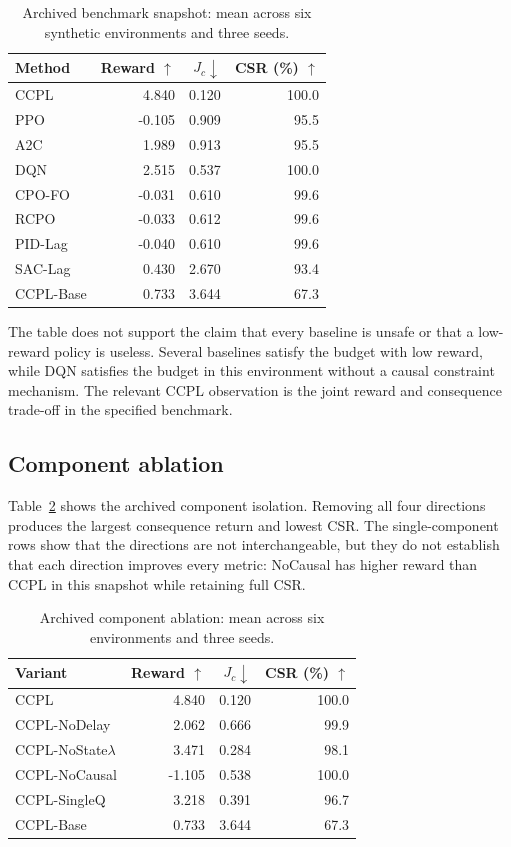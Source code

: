 \documentclass[10pt]{article}
\begin{document}
\begin{table}[t]
\caption{Archived benchmark snapshot: mean across six synthetic environments
and three seeds.}
\label{tab:main}
\centering
\small
\begin{tabular}{lrrr}
\toprule
Method & Reward $\uparrow$ & $J_c\downarrow$ & CSR (\%) $\uparrow$\\
\midrule
CCPL & 4.840 & 0.120 & 100.0\\
PPO & -0.105 & 0.909 & 95.5\\
A2C & 1.989 & 0.913 & 95.5\\
DQN & 2.515 & 0.537 & 100.0\\
CPO-FO & -0.031 & 0.610 & 99.6\\
RCPO & -0.033 & 0.612 & 99.6\\
PID-Lag & -0.040 & 0.610 & 99.6\\
SAC-Lag & 0.430 & 2.670 & 93.4\\
CCPL-Base & 0.733 & 3.644 & 67.3\\
\bottomrule
\end{tabular}
\end{table}

The table does not support the claim that every baseline is unsafe or that a
low-reward policy is useless. Several baselines satisfy the budget with low
reward, while DQN satisfies the budget in this environment without a causal
constraint mechanism. The relevant CCPL observation is the joint reward and
consequence trade-off in the specified benchmark.

\subsection{Component ablation}
Table~\ref{tab:ablation} shows the archived component isolation. Removing all
four directions produces the largest consequence return and lowest CSR. The
single-component rows show that the directions are not interchangeable, but
they do not establish that each direction improves every metric: NoCausal has
higher reward than CCPL in this snapshot while retaining full CSR.

\begin{table}[t]
\caption{Archived component ablation: mean across six environments and three
seeds.}
\label{tab:ablation}
\centering
\small
\begin{tabular}{lrrr}
\toprule
Variant & Reward $\uparrow$ & $J_c\downarrow$ & CSR (\%) $\uparrow$\\
\midrule
CCPL & 4.840 & 0.120 & 100.0\\
CCPL-NoDelay & 2.062 & 0.666 & 99.9\\
CCPL-NoState$\lambda$ & 3.471 & 0.284 & 98.1\\
CCPL-NoCausal & -1.105 & 0.538 & 100.0\\
CCPL-SingleQ & 3.218 & 0.391 & 96.7\\
CCPL-Base & 0.733 & 3.644 & 67.3\\
\bottomrule
\end{tabular}
\end{table}
\end{document}
